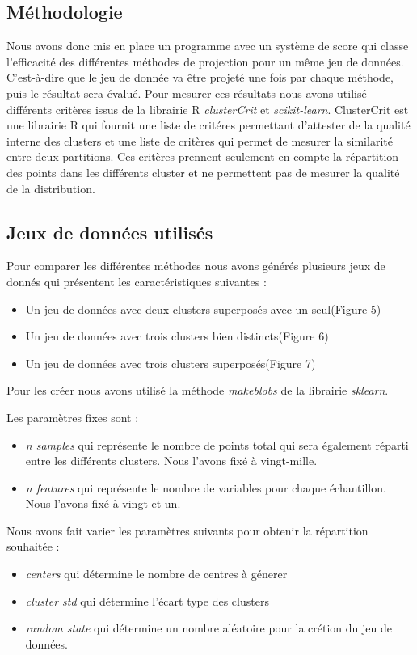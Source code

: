 \subsection{Méthodologie} 
Nous avons donc mis en place un programme avec un système de score qui classe l’efficacité des différentes méthodes de projection pour un même jeu de données. 
C’est-à-dire que le jeu de donnée va être projeté une fois par chaque méthode, puis le résultat sera évalué.
Pour mesurer ces résultats nous avons utilisé différents critères issus de la librairie R  \textit{clusterCrit} et \textit{scikit-learn}.
ClusterCrit est une librairie R qui fournit une liste de critéres permettant d'attester de la qualité interne des clusters et une liste de critères qui permet 
de mesurer la similarité entre deux partitions. Ces critères prennent seulement en compte la répartition des points dans les différents cluster et ne permettent pas de 
mesurer la qualité de la distribution.

\subsection{Jeux de données utilisés}
Pour comparer les différentes méthodes nous avons générés plusieurs jeux de donnés qui présentent les caractéristiques suivantes :
\begin{itemize}
    \item Un jeu de données avec deux clusters superposés avec un seul(Figure 5)
    \item Un jeu de données avec trois clusters bien distincts(Figure 6)
    \item Un jeu de données avec trois clusters superposés(Figure 7)
\end{itemize}
Pour les créer nous avons utilisé la méthode \textit{makeblobs} de la librairie \textit{sklearn}. 

Les paramètres fixes sont :
\begin{itemize}
    \item \textit{n samples} qui représente le nombre de points total qui sera également réparti entre les différents clusters. Nous l'avons fixé à vingt-mille.
    \item \textit{n features} qui représente le nombre de variables pour chaque échantillon. Nous l'avons fixé à vingt-et-un.
\end{itemize}
Nous avons fait varier les paramètres suivants pour obtenir la répartition souhaitée : 
\begin{itemize}
    \item \textit{centers} qui détermine le nombre de centres à génerer
    \item \textit{cluster std} qui détermine l'écart type des clusters
    \item \textit{random state} qui détermine un nombre aléatoire pour la crétion du jeu de données.
\end{itemize}


